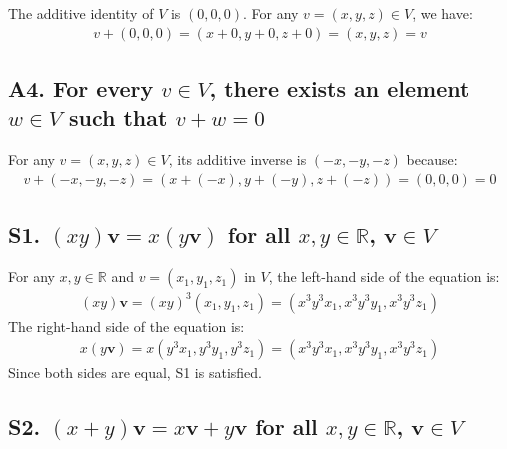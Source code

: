 \documentclass[
  letterpaper,
  DIV=11,
  numbers=noendperiod]{scrartcl}
\begin{document}
The additive identity of \(V\) is \((0,0,0)\). For any
\(v=(x, y, z) \in V\), we have: \begin{align*}
v + (0, 0, 0) = (x + 0, y + 0, z + 0) = (x, y, z) = v
\end{align*}

\subsection{\texorpdfstring{A4. For every \(v \in V\), there exists an
element \(w \in V\) such that
\(v+w=0\)}{A4. For every v \textbackslash in V, there exists an element w \textbackslash in V such that v+w=0}}\label{a4.-for-every-v-in-v-there-exists-an-element-w-in-v-such-that-vw0}

For any \(v = (x, y, z) \in V\), its additive inverse is
\((-x, -y, -z)\) because: \begin{align*}
v + (-x, -y, -z) = (x + (-x), y + (-y), z + (-z)) = (0, 0, 0) = 0
\end{align*}

\subsection{\texorpdfstring{S1. \((xy)\mathbf{v}=x(y\mathbf{v})\) for
all \(x,y \in \mathbb{R}\),
\(\mathbf{v} \in V\)}{S1. (xy)\textbackslash mathbf\{v\}=x(y\textbackslash mathbf\{v\}) for all x,y \textbackslash in \textbackslash mathbb\{R\}, \textbackslash mathbf\{v\} \textbackslash in V}}\label{s1.-xymathbfvxymathbfv-for-all-xy-in-mathbbr-mathbfv-in-v}

For any \(x, y \in \mathbb{R}\) and \(v = (x_1, y_1, z_1)\) in \(V\),
the left-hand side of the equation is: \begin{align*}
(xy)\mathbf{v} = (xy)^3(x_1, y_1, z_1) = (x^3y^3x_1, x^3y^3y_1, x^3y^3z_1)\end{align*}
The right-hand side of the equation is: \begin{align*}
x(y\mathbf{v}) = x(y^3x_1, y^3y_1, y^3z_1) = (x^3y^3x_1, x^3y^3y_1, x^3y^3z_1)
\end{align*} Since both sides are equal, S1 is satisfied.

\subsection{\texorpdfstring{S2.
\((x+y)\mathbf{v} = x\mathbf{v} + y\mathbf{v}\) for all
\(x,y \in \mathbb{R}\),
\(\mathbf{v} \in V\)}{S2. (x+y)\textbackslash mathbf\{v\} = x\textbackslash mathbf\{v\} + y\textbackslash mathbf\{v\} for all x,y \textbackslash in \textbackslash mathbb\{R\}, \textbackslash mathbf\{v\} \textbackslash in V}}\label{s2.-xymathbfv-xmathbfv-ymathbfv-for-all-xy-in-mathbbr-mathbfv-in-v}
\end{document}
